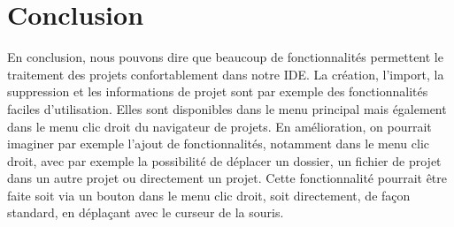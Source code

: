 \documentclass[a4paper,12pt]{article}
\begin{document}
\section{Conclusion}

En conclusion, nous pouvons dire que beaucoup de fonctionnalités permettent le traitement des projets confortablement dans notre IDE. La création, l'import, la suppression et les informations de projet sont par exemple des fonctionnalités faciles d'utilisation. Elles sont disponibles dans le menu principal mais également dans le menu clic droit du navigateur de projets. En amélioration, on pourrait imaginer par exemple l'ajout de fonctionnalités, notamment dans le menu clic droit, avec par exemple la possibilité de déplacer un dossier, un fichier de projet dans un autre projet ou directement un projet. Cette fonctionnalité pourrait être faite soit via un bouton dans le menu clic droit, soit directement, de façon standard, en déplaçant avec le curseur de la souris.
		
\end{document}
